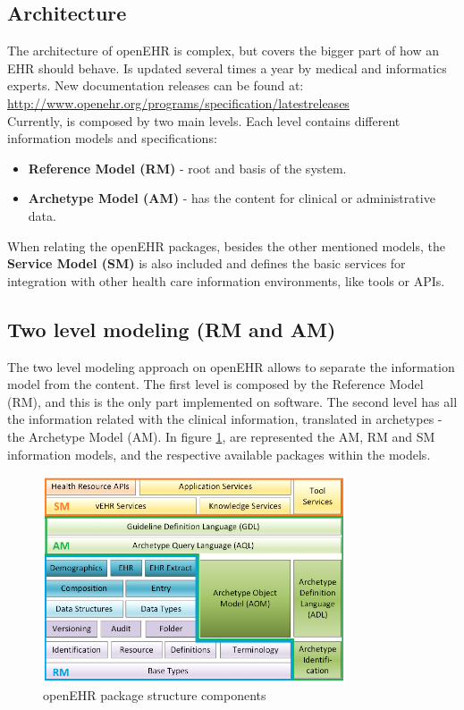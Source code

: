 \documentclass[mim_thesis.tex]{subfiles}
\begin{document}
\subsection{Architecture}
The architecture of openEHR is complex, but covers the bigger part of how an EHR should behave. Is updated several times a year by medical and informatics experts. New documentation releases can be found at: \url{http://www.openehr.org/programs/specification/latestreleases} \\

Currently, is composed by two main levels. Each level contains different information models and specifications:
\begin{itemize}[noitemsep]
\item \textbf{Reference Model (RM)} - root and basis of the system.
\item \textbf{Archetype Model (AM)} - has the content for clinical or administrative data.
\end{itemize}
When relating the openEHR packages, besides the other mentioned models, the \textbf{Service Model (SM)} is also included and defines the basic services for integration with other health care information environments, like tools or APIs. 


\subsection{Two level modeling (RM and AM)}
The two level modeling approach on openEHR allows to separate the information model from the content. The first level is composed by the Reference Model (RM), and this is the only part implemented on software. The second level has all the information related with the clinical information, translated in archetypes - the Archetype Model (AM). In figure \ref{fig:openehr_components}, are represented the AM, RM and SM information models, and the respective available packages within the models. 

\begin{figure}[H]
	\centering
    \includegraphics[width=0.8\textwidth]{img/openehr_components.PNG}
	\caption{openEHR package structure components}
	\label{fig:openehr_components}
\end{figure}
\end{document}
